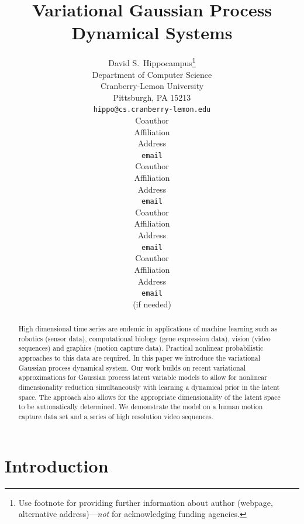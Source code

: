 \documentclass{article} %
\title{Variational Gaussian Process Dynamical Systems}
\author{
David S.~Hippocampus\thanks{ Use footnote for providing further information
about author (webpage, alternative address)---\emph{not} for acknowledging
funding agencies.} \\
Department of Computer Science\\
Cranberry-Lemon University\\
Pittsburgh, PA 15213 \\
\texttt{hippo@cs.cranberry-lemon.edu} \\
\And
Coauthor \\
Affiliation \\
Address \\
\texttt{email} \\
\AND
Coauthor \\
Affiliation \\
Address \\
\texttt{email} \\
\And
Coauthor \\
Affiliation \\
Address \\
\texttt{email} \\
\And
Coauthor \\
Affiliation \\
Address \\
\texttt{email} \\
(if needed)\\
}
\begin{document}
\newcommand{\highlight}[1]{\colorbox{yellow}{#1}}

\newcommand{\bff}{\mathbf{f}}
\newcommand{\bfu}{\mathbf{u}}
\newcommand{\bfy}{\mathbf{y}}
\newcommand{\bfx}{\mathbf{x}}
\newcommand{\bft}{\mathbf{t}}
\newcommand{\bfk}{\mathbf{k}}
\newcommand{\bfmu}{\boldsymbol \mu}
\newcommand{\bfz}{\mathbf{0}}

\newcommand{\T}{{\top}}

\newcommand{\bfa}{\mathbf{a}}
\newcommand{\bb}{\beta^{-1}}
\newcommand{\la}{\left\langle}
\newcommand{\ra}{\right\rangle}
\newcommand{\vv}{\vartheta}

\newcommand{\intd}{\text{d}} %


\maketitle

\begin{abstract}
  High dimensional time series are endemic in applications of machine
  learning such as robotics (sensor data), computational biology (gene
  expression data), vision (video sequences) and graphics (motion
  capture data). Practical nonlinear probabilistic approaches to this
  data are required. In this paper we introduce the variational
  Gaussian process dynamical system. Our work builds on recent
  variational approximations for Gaussian process latent variable
  models to allow for nonlinear dimensionality reduction
  simultaneously with learning a dynamical prior in the latent
  space. The approach also allows for the appropriate dimensionality
  of the latent space to be automatically determined. We demonstrate
  the model on a human motion capture data set and a series of high
  resolution video sequences.
\end{abstract}



\section{Introduction}
\end{document}

